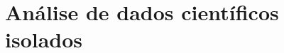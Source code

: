


\section{Análise de dados científicos isolados}%
\label{sec:analise-de-dados-cientificos-isolados}

